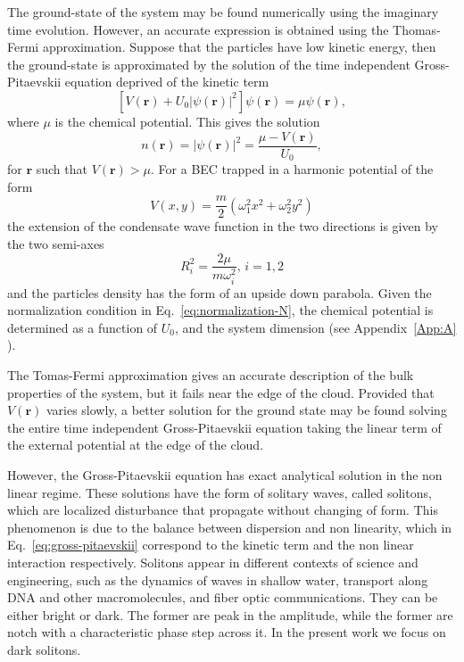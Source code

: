 The ground-state of the system may be found numerically using the imaginary time evolution. However, an accurate expression is obtained using the Thomas-Fermi approximation. Suppose that the particles have low kinetic energy, then the ground-state is approximated by the solution of the time independent Gross-Pitaevskii equation deprived of the kinetic term
\begin{equation}
\left[ V(\textbf{r}) + U_0 |\psi(\textbf{r})|^2 \right] \psi(\textbf{r}) = \mu \psi(\textbf{r}),
\end{equation}
where $\mu$ is the chemical potential. This gives the solution
\begin{equation}
n(\textbf{r}) = |\psi(\textbf{r})|^2 = \frac{\mu - V(\textbf{r})}{U_0},
\end{equation}
for $\textbf{r}$ such that $V(\textbf{r}) > \mu$. 
For a BEC trapped in a harmonic potential of the form
\begin{equation}
V(x,y) = \frac{m}{2} (\omega_1^2 x^2 + \omega_2^2 y^2)
\end{equation}
the extension of the condensate wave function in the two directions is given by the two semi-axes
\begin{equation} \label{eq:TF-radius}
R_i^2 = \frac{2\mu}{m\omega_i^2}, \, i = 1,2
\end{equation}
and the particles density has the form of an upside down parabola. Given the normalization condition in Eq.~\eqref{eq:normalization-N}, the chemical potential is determined as a function of $U_0$, and the system dimension (see Appendix~\ref{App:A} ).

The Tomas-Fermi approximation gives an accurate description of the bulk properties of the system, but it fails near the edge of the cloud. Provided that $V(\textbf{r})$ varies slowly, a better solution for the ground state may be found solving the entire time independent Gross-Pitaevskii equation taking the linear term of the external potential at the edge of the cloud.

However, the Gross-Pitaevskii equation has exact analytical solution in the non linear regime. These solutions have the form of solitary waves, called solitons, which are localized disturbance that propagate without changing of form. This phenomenon is due to the balance between dispersion and non linearity, which in Eq.~\eqref{eq:gross-pitaevskii} correspond to the kinetic term and the non linear interaction respectively. Solitons appear in different contexts of science and engineering, such as the dynamics of waves in shallow water,
transport along DNA and other macromolecules,
and fiber optic communications.
They can be either bright or dark. The former are peak in the amplitude, while the former are notch with a characteristic phase step across it. In the present work we focus on dark solitons. 

